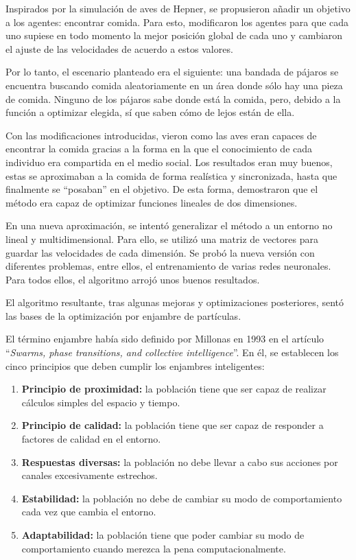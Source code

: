 \documentclass[a4paper,12pt,titlepage]{article}
\begin{document}
Inspirados por la simulación de aves de Hepner, se propusieron añadir un objetivo a los agentes: encontrar comida. Para esto, modificaron los agentes para que cada uno supiese en todo momento la mejor posición global de cada uno y cambiaron el ajuste de las velocidades de acuerdo a estos valores.

Por lo tanto, el escenario planteado era el siguiente: una bandada de pájaros se encuentra buscando comida aleatoriamente en un área donde sólo hay una pieza de comida. Ninguno de los pájaros sabe donde está la comida, pero, debido a la función a optimizar elegida, sí que saben cómo de lejos están de ella.

Con las modificaciones introducidas, vieron como las aves eran capaces de encontrar la comida gracias a la forma en la que el conocimiento de cada individuo era compartida en el medio social. Los resultados eran muy buenos, estas se aproximaban a la comida de forma realística y sincronizada, hasta que finalmente se “posaban” en el objetivo. De esta forma, demostraron que el método era capaz de optimizar funciones lineales de dos dimensiones.

En una nueva aproximación, se intentó generalizar el método a un entorno no lineal y multidimensional. Para ello, se utilizó una matriz de vectores para guardar las velocidades de cada dimensión. Se probó la nueva versión con diferentes problemas, entre ellos, el entrenamiento de varias redes neuronales. Para todos ellos, el algoritmo arrojó unos buenos resultados.

El algoritmo resultante, tras algunas mejoras y optimizaciones posteriores, sentó las bases de la optimización por enjambre de partículas.

El término enjambre había sido definido por Millonas en 1993 en el artículo “\textit{Swarms, phase transitions, and collective intelligence}”\citep{millonas_swarms_1993}. En él, se establecen los cinco principios que deben cumplir los enjambres inteligentes: 

\begin{enumerate}[noitemsep]
	\item \textbf{Principio de proximidad:} la población tiene que ser capaz de realizar cálculos simples del espacio y tiempo.
	\item \textbf{Principio de calidad:} la población tiene que ser capaz de responder a factores de calidad en el entorno.
	\item \textbf{Respuestas diversas:} la población no debe llevar a cabo sus acciones por canales excesivamente estrechos.
	\item \textbf{Estabilidad:} la población no debe de cambiar su modo de comportamiento cada vez que cambia el entorno.
	\item \textbf{Adaptabilidad:} la población tiene que poder cambiar su modo de comportamiento cuando merezca la pena computacionalmente.
\end{enumerate}
\end{document}
